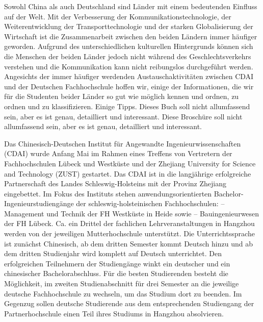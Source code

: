 \normalfont\Huge\sffamily{} \par

\thispagestyle{empty}
 \vspace*{3cm}
 \normalfont\normalsize
 \justify
Sowohl China als auch Deutschland sind L\"ander mit einem bedeutenden Einfluss auf der Welt. Mit der Verbesserung der Kommunikationstechnologie, der Weiterentwicklung der Transporttechnologie und der starken Globalisierung der Wirtschaft ist die Zusammenarbeit zwischen den beiden Ländern immer häufiger geworden. Aufgrund des unterschiedlichen kulturellen Hintergrunds können sich die Menschen der beiden Länder jedoch nicht während des Geschlechtsverkehrs verstehen und die Kommunikation kann nicht reibungslos durchgeführt werden. Angesichts der immer häufiger werdenden Austauschaktivitäten zwischen CDAI und der Deutschen Fachhochschule hoffen wir, einige der Informationen, die wir für die Studenten beider L\"ander so gut wie möglich kennen und ordnen, zu ordnen und zu klassifizieren. Einige Tipps. Dieses Buch soll nicht allumfassend sein, aber es ist genau, detailliert und interessant. Diese Broschüre soll nicht allumfassend sein, aber es ist genau, detailliert und interessant.
\par
Das Chinesisch-Deutschen Institut für Angewandte Ingenieurwissenschaften (CDAI) wurde Anfang Mai im Rahmen eines Treffens von Vertretern der Fachhochschulen Lübeck und Westküste und der Zhejiang University for Science and Technology (ZUST) gestartet. Das CDAI ist in die langjährige erfolgreiche Partnerschaft des Landes Schleswig-Holsteins mit der Provinz Zhejiang eingebettet. Im Fokus des Instituts stehen anwendungsorientierten Bachelor-Ingenieurstudiengänge der schleswig-holsteinischen Fachhochschulen: – Management und Technik der FH Westküste in Heide sowie – Bauingenieurwesen der FH Lübeck. Ca. ein Drittel der fachlichen Lehrveranstaltungen in Hangzhou werden von der jeweiligen Mutterhochschule unterstützt. Die Unterrichtssprache ist zunächst Chinesisch, ab dem dritten Semester kommt Deutsch hinzu und ab dem dritten Studienjahr wird komplett auf Deutsch unterrichtet. Den erfolgreichen Teilnehmern der Studiengänge winkt ein deutscher und ein chinesischer Bachelorabschluss. Für die besten Studierenden besteht die Möglichkeit, im zweiten Studienabschnitt für drei Semester an die jeweilige deutsche Fachhochschule zu wechseln, um das Studium dort zu beenden. Im Gegenzug sollen deutsche Studierende aus dem entsprechenden Studiengang der Partnerhochschule einen Teil ihres Studiums in Hangzhou absolvieren.

